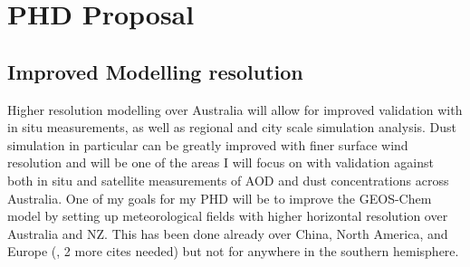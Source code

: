 \section{PHD Proposal}

\subsection{Improved Modelling resolution}
Higher resolution modelling over Australia will allow for improved validation with in situ measurements, as well as regional and city scale simulation analysis. 
Dust simulation in particular can be greatly improved with finer surface wind resolution and will be one of the areas I will focus on with validation against both in situ and satellite measurements of AOD and dust concentrations across Australia.
One of my goals for my PHD will be to improve the GEOS-Chem model by setting up meteorological fields with higher horizontal resolution over Australia and NZ.
This has been done already over China, North America, and Europe (\cite{Chen_2009}, 2 more cites needed) but not for anywhere in the southern hemisphere.

  